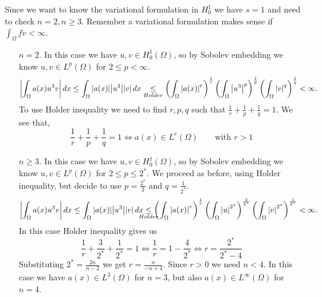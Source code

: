 Since we want to know the variational formulation in \(H^1_0\) we have \(s =
1\) and need to check \(n = 2, n \geq 3\). Remember a variational formulation
makes sense if \(\int_\Omega fv < \infty\).
\begin{itemize}
    \item[\(n = 2\).] In this case we have \(u, v \in H^1_0(\Omega)\), so by Sobolev embedding we know \(u, v \in L^p(\Omega)\) for \(2 \leq p < \infty\).
          \[
              \abs{\int_\Omega a(x) u^3 v}  \, dx \leq \int_\Omega \abs{a(x)} \abs{u^3} \abs{v} \, dx \underset{Holder}{\leq} \left(\int_\Omega \abs{a(x)}^r\right)^{\frac{1}{r}} \left(\int_\Omega \abs{u^3}^p \right)^{\frac{1}{p}} \left(\int_\Omega \abs{v}^q \right)^{\frac{1}{q}} < \infty.
          \]
          To use Holder inequality we need to find \(r, p, q\) such that \(\frac{1}{r} +
          \frac{1}{p} + \frac{1}{q} = 1\). We see that,
          \[
              \frac{1}{r} + \frac{1}{p} + \frac{1}{q} = 1 \iff a(x) \in L^r(\Omega) \qquad \text{with } r > 1
          \]
    \item[\(n \geq 3\).] In this case we have \(u, v \in H^1_0(\Omega)\), so by Sobolev embedding we know \(u, v \in L^p(\Omega)\) for \(2 \leq p \leq 2^*\).
          We proceed as before, using Holder inequality, but decide to use \(p = \frac{2^*}{3}\) and \(q = \frac{1}{2^*}.\)
          \[
              \abs{\int_\Omega a(x) u^3 v}  \, dx \leq \int_\Omega \abs{a(x)} \abs{u^3} \abs{v} \, dx \underset{\mathclap{Holder}}{\leq} \left(\int_\Omega \abs{a(x)}^r\right)^{\frac{1}{r}} \left(\int_\Omega \abs{u}^{2^*} \right)^{\frac{3}{2^*}} \left(\int_\Omega \abs{v}^{2^*} \right)^{\frac{1}{2^*}} < \infty.
          \]
          In this case Holder inequality gives us
          \[
              \frac{1}{r} + \frac{3}{2^*} + \frac{1}{2^*} = 1 \iff \frac{1}{r} = 1 - \frac{4}{2^*} \iff r = \frac{2^*}{2^* - 4}
          \]
          Substituting \(2^* = \frac{2n}{n - 2}\) we get \(r = \frac{n}{-n + 4}\). Since
          \(r > 0\) we need \(n < 4\). In this case we have \(a(x) \in L^3(\Omega)\) for
          \(n = 3\), but also \(a(x) \in L^\infty(\Omega)\) for \(n = 4\).
\end{itemize}

